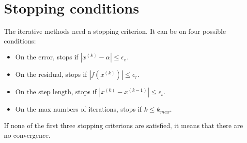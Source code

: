 \documentclass[12pt, a4paper]{report}
\begin{document}
    \section{Stopping conditions}
    The iterative methods need a stopping criterion. It can be on four possible conditions: 
    \begin{itemize}
        \item On the error, stops if $\left\lvert x^{(k)}-\alpha \right\rvert \leq \epsilon_e$.
        \item On the residual, stops if $\left\lvert f\left(x^{(k)}\right) \right\rvert \leq \epsilon_r$. 
        \item On the step length, stops if $\left\lvert x^{(k)}-x^{(k-1)} \right\rvert \leq \epsilon_s$. 
        \item On the max numbers of iterations, stops if $k \leq k_{max}$. 
    \end{itemize}
    If none of the first three stopping criterions are satisfied, it means that there are no convergence. 
\end{document}
